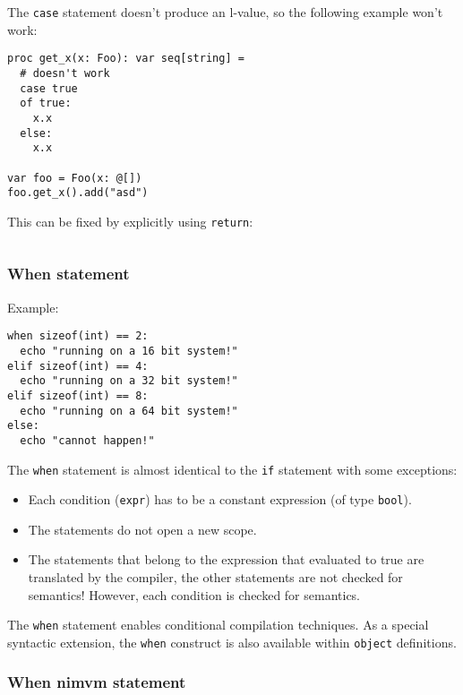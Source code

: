 The \texttt{case} statement doesn't produce an l-value, so the following
example won't work:

\begin{verbatim}
proc get_x(x: Foo): var seq[string] =
  # doesn't work
  case true
  of true:
    x.x
  else:
    x.x

var foo = Foo(x: @[])
foo.get_x().add("asd")
\end{verbatim}

This can be fixed by explicitly using \texttt{return}:

\begin{verbatim}
\end{verbatim}

\hypertarget{when-statement}{%
\subsubsection{When statement}\label{when-statement}}

Example:

\begin{verbatim}
when sizeof(int) == 2:
  echo "running on a 16 bit system!"
elif sizeof(int) == 4:
  echo "running on a 32 bit system!"
elif sizeof(int) == 8:
  echo "running on a 64 bit system!"
else:
  echo "cannot happen!"
\end{verbatim}

The \texttt{when} statement is almost identical to the \texttt{if}
statement with some exceptions:

\begin{itemize}
\tightlist
\item
  Each condition (\texttt{expr}) has to be a constant expression (of
  type \texttt{bool}).
\item
  The statements do not open a new scope.
\item
  The statements that belong to the expression that evaluated to true
  are translated by the compiler, the other statements are not checked
  for semantics! However, each condition is checked for semantics.
\end{itemize}

The \texttt{when} statement enables conditional compilation techniques.
As a special syntactic extension, the \texttt{when} construct is also
available within \texttt{object} definitions.

\hypertarget{when-nimvm-statement}{%
\subsubsection{When nimvm statement}\label{when-nimvm-statement}}

